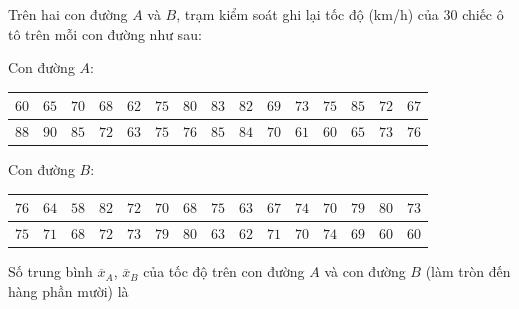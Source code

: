 \begin{ex}
Trên hai con đường $A$ và $B$, trạm kiểm soát ghi lại tốc độ (km/h) của $30$ chiếc ô tô trên mỗi con đường như sau:

Con đường $A$:
\begin{center}
\begin{tabular}{|c|c|c|c|c|c|c|c|c|c|c|c|c|c|c|}\hline
$60$ & $65$ & $70$ & $68$ & $62$ & $75$ & $80$ & $83$ & $82$ & $69$ & $73$ & $75$ & $85$ & $72$ & $67$\\\hline
$88$ & $90$ & $85$ & $72$ & $63$ & $75$ & $76$ & $85$ & $84$ & $70$ & $61$ & $60$ & $65$ & $73$ & $76$\\\hline
\end{tabular}
\end{center}
Con đường $B$:
\begin{center}
\begin{tabular}{|c|c|c|c|c|c|c|c|c|c|c|c|c|c|c|}\hline
$76$ & $64$ & $58$ & $82$ & $72$ & $70$ & $68$ & $75$ & $63$ & $67$ & $74$ & $70$ & $79$ & $80$ & $73$\\\hline
$75$ & $71$ & $68$ & $72$ & $73$ & $79$ & $80$ & $63$ & $62$ & $71$ & $70$ & $74$ & $69$ & $60$ & $60$\\\hline
\end{tabular}
\end{center}
Số trung bình $\overline x_A$, $\overline x_B$ của tốc độ trên con đường $A$ và con đường $B$ (làm tròn đến hàng phần mười) là
\end{ex}
